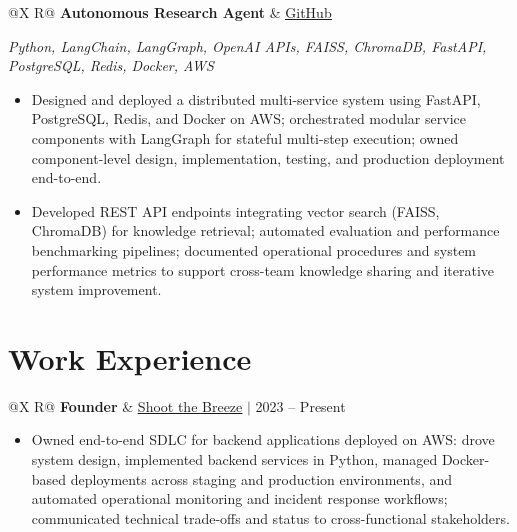 \documentclass[a4paper,10pt]{article}
\newcommand{\ulink}[2]{\href{#1}{\uline{#2}}}
\newcommand{\subheading}[1]{{\color[HTML]{0A0A0A}\fontsize{12}{14}\selectfont\bfseries #1}}
\newcommand{\techstack}[1]{{\color[HTML]{5C5C5C}\fontsize{10.5}{12.5}\selectfont\itshape #1}}
\newcommand{\meta}[1]{{\color[HTML]{5C5C5C}\fontsize{10.5}{12.5}\selectfont #1}}
\begin{document}
\begin{tabularx}{\linewidth}{@{}X R@{}}
\subheading{Autonomous Research Agent} & \meta{\ulink{https://github.com/su-jin1425/Autonomous-Research-Agent}{GitHub}}
\end{tabularx}
\vspace{1pt}
\techstack{Python, LangChain, LangGraph, OpenAI APIs, FAISS, ChromaDB, FastAPI, PostgreSQL, Redis, Docker, AWS}
\begin{itemize}[nosep, leftmargin=1.5em, itemsep=1pt, topsep=2pt]
\item {\color[HTML]{0A0A0A}\fontsize{11}{14}\selectfont
Designed and deployed a distributed multi-service system using FastAPI, PostgreSQL, Redis, and Docker on AWS; orchestrated modular service components with LangGraph for stateful multi-step execution; owned component-level design, implementation, testing, and production deployment end-to-end.}
\item {\color[HTML]{0A0A0A}\fontsize{11}{14}\selectfont
Developed REST API endpoints integrating vector search (FAISS, ChromaDB) for knowledge retrieval; automated evaluation and performance benchmarking pipelines; documented operational procedures and system performance metrics to support cross-team knowledge sharing and iterative system improvement.}
\end{itemize}

\vspace{2pt}

\section{Work Experience}
\vspace{2pt}

\begin{tabularx}{\linewidth}{@{}X R@{}}
\subheading{Founder} & \meta{\ulink{https://shoot-the-breeze.vercel.app}{Shoot the Breeze} $|$ 2023 -- Present}
\end{tabularx}
\begin{itemize}[nosep, leftmargin=1.5em, itemsep=1pt, topsep=2pt]
\item {\color[HTML]{0A0A0A}\fontsize{11}{14}\selectfont
Owned end-to-end SDLC for backend applications deployed on AWS: drove system design, implemented backend services in Python, managed Docker-based deployments across staging and production environments, and automated operational monitoring and incident response workflows; communicated technical trade-offs and status to cross-functional stakeholders.}
\end{itemize}
\end{document}
